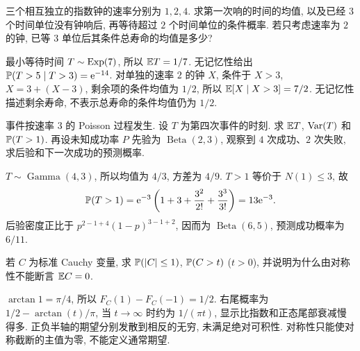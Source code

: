 \begin{exercise}
三个相互独立的指数钟的速率分别为 $1,2,4$. 求第一次响的时间的均值, 以及已经 $3$ 个时间单位没有钟响后, 再等待超过 $2$ 个时间单位的条件概率. 若只考虑速率为 $2$ 的钟, 已等 $3$ 单位后其条件总寿命的均值是多少?
\end{exercise}
\begin{solution}
最小等待时间 $T\sim\operatorname{Exp}(7)$, 所以 $\mathbb E T=1/7$. 无记忆性给出
$\mathbb P(T>5\mid T>3)=\mathrm e^{-14}$. 对单独的速率 $2$ 的钟 $X$, 条件于 $X>3$, $X=3+(X-3)$, 剩余项的条件均值为 $1/2$, 所以 $\mathbb E[X\mid X>3]=7/2$. 无记忆性描述剩余寿命, 不表示总寿命的条件均值仍为 $1/2$.
\end{solution}

\begin{exercise}
事件按速率 $3$ 的 Poisson 过程发生. 设 $T$ 为第四次事件的时刻. 求 $\mathbb E T$, $\operatorname{Var}(T)$ 和 $\mathbb P(T>1)$. 再设未知成功率 $P$ 先验为 $\operatorname{Beta}(2,3)$, 观察到 $4$ 次成功、$2$ 次失败, 求后验和下一次成功的预测概率.
\end{exercise}
\begin{solution}
$T\sim\operatorname{Gamma}(4,3)$, 所以均值为 $4/3$, 方差为 $4/9$. $T>1$ 等价于 $N(1)\le3$, 故
\[
 \mathbb P(T>1)=\mathrm e^{-3}\left(1+3+\frac{3^2}{2!}+\frac{3^3}{3!}\right)
 =13\mathrm e^{-3}.
\]
后验密度正比于 $p^{2-1+4}(1-p)^{3-1+2}$, 因而为 $\operatorname{Beta}(6,5)$, 预测成功概率为 $6/11$.
\end{solution}

\begin{exercise}
若 $C$ 为标准 Cauchy 变量, 求 $\mathbb P(|C|\le1)$, $\mathbb P(C>t)$ ($t>0$), 并说明为什么由对称性不能断言 $\mathbb E C=0$.
\end{exercise}
\begin{solution}
$\arctan1=\pi/4$, 所以 $F_C(1)-F_C(-1)=1/2$. 右尾概率为 $1/2-\arctan(t)/\pi$, 当 $t\to\infty$ 时约为 $1/(\pi t)$, 显示比指数和正态尾部衰减慢得多. 正负半轴的期望分别发散到相反的无穷, 未满足绝对可积性. 对称性只能使对称截断的主值为零, 不能定义通常期望.
\end{solution}
